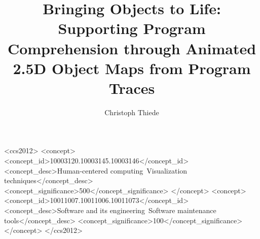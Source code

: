 \documentclass[sigconf,natbib=false,nonacm,screen]{acmart}
\begin{document}
\title{Bringing Objects to Life: Supporting Program Comprehension through Animated 2.5D Object Maps from Program Traces}

\author{Christoph Thiede}




\begin{CCSXML}
<ccs2012>
	<concept>
		<concept_id>10003120.10003145.10003146</concept_id>
		<concept_desc>Human-centered computing~Visualization techniques</concept_desc>
		<concept_significance>500</concept_significance>
	</concept>
	<concept>
		<concept_id>10011007.10011006.10011073</concept_id>
		<concept_desc>Software and its engineering~Software maintenance tools</concept_desc>
		<concept_significance>100</concept_significance>
	</concept>
</ccs2012>
\end{CCSXML}


\end{document}

